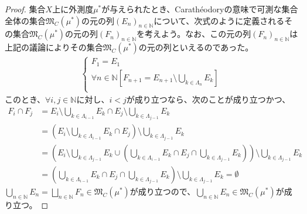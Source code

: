 \documentclass[dvipdfmx]{jsarticle}
\begin{document}
\begin{proof}
集合$X$上に外測度$\mu^{*}$が与えられたとき、Carathéodoryの意味で可測な集合全体の集合$\mathfrak{M}_{C}\left( \mu^{*} \right)$の元の列$\left( E_{n} \right)_{n \in \mathbb{N}}$について、次式のように定義されるその集合$\mathfrak{M}_{C}\left( \mu^{*} \right)$の元の列$\left( F_{n} \right)_{n \in \mathbb{N}}$を考えよう。なお、この元の列$\left( F_{n} \right)_{n \in \mathbb{N}}$は上記の議論によりその集合$\mathfrak{M}_{C}\left( \mu^{*} \right)$の元の列といえるのであった。
\begin{align*}
\left\{ \begin{matrix}
F_{1} = E_{1} \\
\forall n \in \mathbb{N}\left[ F_{n + 1} = E_{n + 1} \setminus \bigcup_{k \in \varLambda_{n}} E_{k} \right] \\
\end{matrix} \right.\ 
\end{align*}
このとき、$\forall i,j \in \mathbb{N}$に対し、$i < j$が成り立つなら、次のことが成り立つかつ、
\begin{align*}
F_{i} \cap F_{j} &= E_{i} \setminus \bigcup_{k \in \varLambda_{i - 1}} E_{k} \cap E_{j} \setminus \bigcup_{k \in \varLambda_{j - 1}} E_{k}\\
&= \left( E_{i} \setminus \bigcup_{k \in \varLambda_{i - 1}} E_{k} \cap E_{j} \right) \setminus \bigcup_{k \in \varLambda_{j - 1}} E_{k}\\
&= \left( E_{i} \setminus \bigcup_{k \in \varLambda_{j - 1}} E_{k} \cup \left( \bigcup_{k \in \varLambda_{i - 1}} E_{k} \cap E_{j} \cap \bigcup_{k \in \varLambda_{j - 1}} E_{k} \right) \right) \setminus \bigcup_{k \in \varLambda_{j - 1}} E_{k}\\
&= \left( \bigcup_{k \in \varLambda_{i - 1}} E_{k} \cap E_{j} \cap \bigcup_{k \in \varLambda_{j - 1}} E_{k} \right) \setminus \bigcup_{k \in \varLambda_{j - 1}} E_{k} = \emptyset
\end{align*}
$\bigcup_{n \in \mathbb{N}} E_{n} = \bigsqcup_{n \in \mathbb{N}} F_{n} \in \mathfrak{M}_{C}\left( \mu^{*} \right)$が成り立つので、$\bigcup_{n \in \mathbb{N}} E_{n} \in \mathfrak{M}_{C}\left( \mu^{*} \right)$が成り立つ。
\end{proof}
\end{document}
